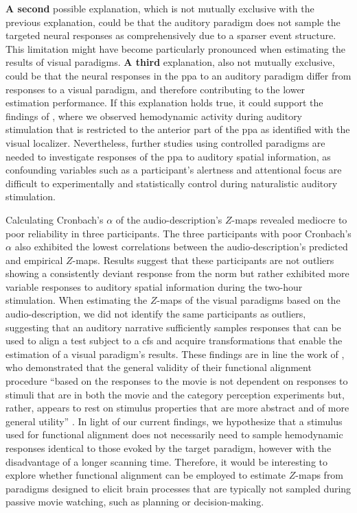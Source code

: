 %
\textbf{A second} possible explanation, which is not mutually exclusive with the
previous explanation, could be that the auditory paradigm does not sample the
targeted neural responses as comprehensively due to a sparser event structure.
%
This limitation might have become particularly pronounced when estimating the
results of visual paradigms.
%
\textbf{A third} explanation, also not mutually exclusive, could be that the
neural responses in the \ac{ppa} to an auditory paradigm differ from responses
to a visual paradigm, and therefore contributing to the lower estimation
performance.
%
If this explanation holds true, it could support the findings of
\citet{haeusler2022processing}, where we observed hemodynamic activity during
auditory stimulation that is restricted to the anterior part of the \ac{ppa} as
identified with the visual localizer.
%
Nevertheless, further studies using controlled paradigms are needed to
investigate responses of the \ac{ppa} to auditory spatial information, as
confounding variables such as a participant's alertness and attentional focus
are difficult to experimentally and statistically control during naturalistic
auditory stimulation.

%
Calculating Cronbach's $\alpha$ of the audio-description's $Z$-maps revealed
mediocre to poor reliability in three participants.
%
The three participants with poor Cronbach's $\alpha$ also exhibited the lowest
correlations between the audio-description's predicted and empirical $Z$-maps.
%
Results suggest that these participants are not outliers showing a consistently
deviant response from the norm but rather exhibited more variable responses to
auditory spatial information during the two-hour stimulation.
%
When estimating the $Z$-maps of the visual paradigms based on the
audio-description, we did not identify the same participants as outliers,
suggesting that an auditory narrative sufficiently samples responses that can be
used to align a test subject to a \ac{cfs} and acquire transformations that
enable the estimation of a visual paradigm's results.
%
These findings are in line the work of \citet{haxby2011common}, who demonstrated
that the general validity of their functional alignment procedure ``based on the
responses to the movie is not dependent on responses to stimuli that are in both
the movie and the category perception experiments but, rather, appears to rest
on stimulus properties that are more abstract and of more general utility''
\citep[][p. 409]{haxby2011common}.
%
In light of our current findings, we hypothesize that a stimulus used for
functional alignment does not necessarily need to sample hemodynamic responses
identical to those evoked by the target paradigm, however with the disadvantage
of a longer scanning time.
%
Therefore, it would be interesting to explore whether functional alignment can
be employed to estimate $Z$-maps from paradigms designed to elicit brain
processes that are typically not sampled during passive movie watching, such as
planning or decision-making.

